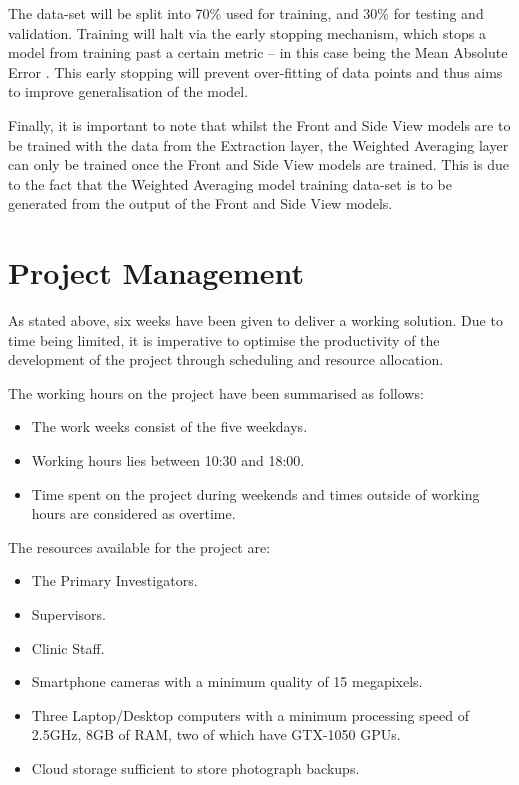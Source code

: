 \documentclass[conference]{IEEEtran}
\begin{document}
The data-set will be split into 70\% used for training, and 30\% for testing and validation.
Training will halt via the early stopping mechanism, which stops a model from training past a certain metric -- in this case being the Mean Absolute Error \cite{bmifromface}.
This early stopping will prevent over-fitting of data points and thus aims to improve generalisation of the model.

Finally, it is important to note that whilst the Front and Side View models are to be trained with the data from the Extraction layer, the Weighted Averaging layer can only be trained once the Front and Side View models are trained.
This is due to the fact that the Weighted Averaging model training data-set is to be generated from the output of the Front and Side View models.
\section{Project Management}
As stated above, six weeks have been given to deliver a working solution.
Due to time being limited, it is imperative to optimise the productivity of the development of the project through scheduling and resource allocation.

The working hours on the project have been summarised as follows: 
\begin{itemize}
    \item The work weeks consist of the five weekdays.
    \item Working hours lies between 10:30 and 18:00.
    \item Time spent on the project during weekends and times outside of working hours are considered as overtime.
\end{itemize}
	 
The resources available for the project are:
\begin{itemize}
    \item The Primary Investigators.
    \item Supervisors.
    \item Clinic Staff.
    \item Smartphone cameras with a minimum quality of 15 megapixels.
    \item Three Laptop/Desktop computers with a minimum processing speed of 2.5GHz, 8GB of RAM, two of which have GTX-1050 GPUs.
    \item Cloud storage sufficient to store photograph backups.
\end{itemize}
\end{document}
